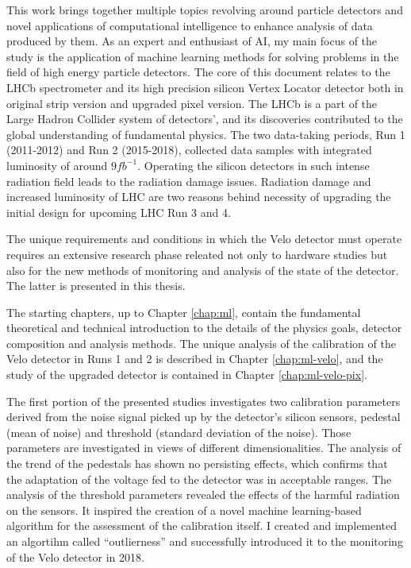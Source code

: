 This work brings together multiple topics revolving around particle detectors and novel applications of computational intelligence to enhance analysis of data produced by them.
As an expert and enthusiast of AI, my main focus of the study is the application of machine learning methods for solving problems in the field of high energy particle detectors.
The core of this document relates to the LHCb spectrometer and its high precision silicon Vertex Locator detector both in original strip version and upgraded pixel version.
The LHCb is a part of the Large Hadron Collider system of detectors', and its discoveries contributed to the global understanding of fundamental physics.
The two data-taking periods, Run 1 (2011-2012) and Run 2 (2015-2018), collected data samples with integrated luminosity of around $9fb^{-1}$. Operating the silicon detectors in such intense radiation field leads to the radiation damage issues. Radiation damage and increased luminosity of LHC are two reasons behind necessity of upgrading the initial design for upcoming LHC Run 3 and 4.


The unique requirements and conditions in which the Velo detector must operate requires an extensive research phase releated not only to hardware studies but also for the new methods of monitoring and analysis of the state of the detector. The latter is presented in this thesis.

The starting chapters, up to Chapter \ref{chap:ml}, contain the fundamental theoretical and technical introduction to the details of the physics goals, detector composition and analysis methods.
The unique analysis of the calibration of the Velo detector in Runs 1 and 2 is described in Chapter \ref{chap:ml-velo}, and the study of the upgraded detector is contained in Chapter \ref{chap:ml-velo-pix}.

The first portion of the presented studies investigates two calibration parameters derived from the noise signal picked up by the detector's silicon sensors, pedestal (mean of noise) and threshold (standard deviation of the noise). Those parameters are investigated in views of different dimensionalities.
The analysis of the trend of the pedestals has shown no persisting effects, which confirms that the adaptation of the voltage fed to the detector was in acceptable ranges.
The analysis of the threshold parameters revealed the effects of the harmful radiation on the sensors. It inspired the creation of a novel machine learning-based algorithm for the assessment of the calibration itself.
I created and implemented an algortihm called ``outlierness'' and successfully introduced it to the monitoring of the Velo detector in 2018.

